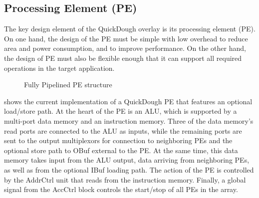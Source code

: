


\subsection{Processing Element (PE)}
The key design element of the QuickDough overlay is its processing element (PE).
On one hand, the design of the PE must be simple with low overhead to reduce area and power consumption, and to improve performance.
On the other hand, the design of PE must also be flexible enough that it can support all required operations in the target application.

\begin{figure}
\center{\texttt{[image: pe]}}
\caption{Fully Pipelined PE structure}
\label{fig:pe}
\end{figure}

 shows the current implementation of a QuickDough PE that features an optional load/store path. 
At the heart of the PE is an ALU, which is supported by a multi-port data memory and an instruction memory.
Three of the data memory's read ports are connected to the ALU as inputs, while the remaining ports are sent to the output multiplexors for connection to neighboring PEs and the optional store path to OBuf external to the PE.
At the same time, this data memory takes input from the ALU output, data arriving from neighboring PEs, as well as from the optional IBuf loading path.
The action of the PE is controlled by the AddrCtrl unit that reads from the instruction memory.
Finally, a global signal from the AccCtrl block controls the start/stop of all PEs in the array.


